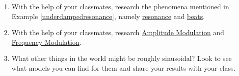 \begin{enumerate}
\begin{enumerate}
\item Use the model you found in part \ref{MoonIllumination} to predict the fraction of the moon illuminated on June 1, 2009. \footnote{The listed fraction is $0.62$.}

\item Compare your results to those obtained using a graphing utility.

\end{enumerate}

\item  With the help of your classmates, research the phenomena mentioned in Example \ref{underdampedresonance}, namely \href{http://en.wikipedia.org/wiki/Resonance}{\underline{resonance}} and \href{http://en.wikipedia.org/wiki/Beat_(acoustics)}{\underline{beats}}.

\item  With the help of your classmates, research \href{http://en.wikipedia.org/wiki/Amplitude_modulation}{\underline{Amplitude Modulation}} and \href{http://en.wikipedia.org/wiki/Frequency_modulation}{\underline{Frequency Modulation}}.

\item What other things in the world might be roughly sinusoidal?  Look to see what models you can find for them and share your results with your class.

\end{enumerate}

\newpage



